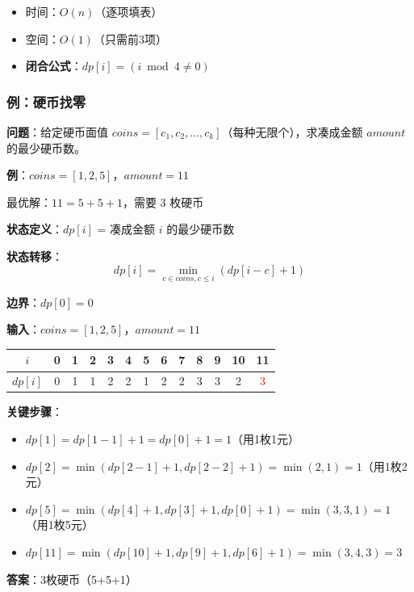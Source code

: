 \documentclass[12pt, a4paper]{ctexart}
\begin{document}
\begin{complexitybox}
\begin{itemize}
    \item 时间：$O(n)$（逐项填表）
    \item 空间：$O(1)$（只需前3项）
    \item \textbf{闭合公式}：$dp[i] = (i \bmod 4 \neq 0)$
\end{itemize}
\end{complexitybox}
\subsubsection{例：硬币找零}

\begin{blackboard}[硬币找零问题]

\textbf{问题}：给定硬币面值 $coins = [c_1, c_2, \ldots, c_k]$（每种无限个），求凑成金额 $amount$ 的最少硬币数。

\textbf{例}：$coins = [1, 2, 5]$，$amount = 11$

最优解：$11 = 5 + 5 + 1$，需要 3 枚硬币

\textbf{状态定义}：$dp[i]$ = 凑成金额 $i$ 的最少硬币数

\textbf{状态转移}：
\[
dp[i] = \min_{c \in coins, c \leq i} (dp[i - c] + 1)
\]

\textbf{边界}：$dp[0] = 0$

\end{blackboard}

\begin{blackboard}[硬币找零手算]

\textbf{输入}：$coins = [1, 2, 5]$，$amount = 11$

\begin{center}
\begin{tabular}{c|cccccccccccc}
$i$ & 0 & 1 & 2 & 3 & 4 & 5 & 6 & 7 & 8 & 9 & 10 & 11 \\
\hline
$dp[i]$ & 0 & 1 & 1 & 2 & 2 & 1 & 2 & 2 & 3 & 3 & 2 & \textcolor{red}{3} \\
\end{tabular}
\end{center}

\textbf{关键步骤}：
\begin{itemize}
    \item $dp[1] = dp[1-1] + 1 = dp[0] + 1 = 1$（用1枚1元）
    \item $dp[2] = \min(dp[2-1]+1, dp[2-2]+1) = \min(2, 1) = 1$（用1枚2元）
    \item $dp[5] = \min(dp[4]+1, dp[3]+1, dp[0]+1) = \min(3, 3, 1) = 1$（用1枚5元）
    \item $dp[11] = \min(dp[10]+1, dp[9]+1, dp[6]+1) = \min(3, 4, 3) = 3$
\end{itemize}

\textbf{答案}：3枚硬币（5+5+1）

\end{blackboard}
\end{document}

